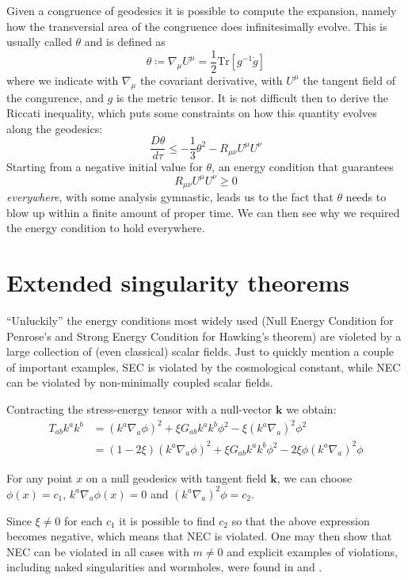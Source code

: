 \documentclass[12pt, a4paper]{article}
\begin{document}
Given a congruence of geodesics it is possible to compute the expansion, namely how the transversial area of the congruence does infinitesimally evolve. This is usually called \(\theta\) and is defined as 
\[
\theta \coloneqq \nabla_{\mu} U^{\mu} = \frac{1}{2} \text{Tr}\left[g^{-1}\dot{g}\right]
\]
where we indicate with \(\nabla_{\mu}\) the covariant derivative, with \(U^{\mu}\) the tangent field of the congurence, and \(g\) is the metric tensor.
It is not difficult then to derive the Riccati inequality, which puts some constraints on how this quantity evolves along the geodesics:
\[
\frac{D\theta }{d\tau} \le -\frac{1}{3} \theta ^2 - R_{\mu\nu}U^{\mu}U^{\nu}
\]
Starting from a negative initial value for \(\theta\), an energy condition that guarantees 
\[
R_{\mu\nu}U^{\mu}U^{\nu} \ge 0
\]
\emph{everywhere}, with some analysis gymnastic, leads us to the fact that \(\theta\) needs to blow up within a finite amount of proper time.
We can then see why we required the energy condition to hold everywhere.

\section{Extended singularity theorems}
``Unluckily'' the energy conditions most widely used (Null Energy Condition for Penrose's and Strong Energy Condition for Hawking's theorem) are violeted by a large collection of (even classical) scalar fields. 
Just to quickly mention a couple of important examples, SEC is violated by the cosmological constant, while NEC can be violated by non-minimally coupled scalar fields.

Contracting the stress-energy tensor with a null-vector \(\textbf{k}\) we obtain:
\begin{align*}
	T_{ab}k^ak^b &= (k^a\nabla_a\phi)^2 + \xi G_{ab}k^ak^b\phi^2 -\xi(k^a\nabla_a)^2\phi^2 \\
	&= (1 - 2\xi)(k^a\nabla_a\phi)^2 + \xi G_{ab}k^ak^b\phi^2 - 2\xi\phi(k^a\nabla_a)^2\phi
\end{align*}

For any point \(x\) on a null geodesics with tangent field \(\textbf{k}\), we can choose \(\phi(x) = c_1\), \(k^a\nabla_a \phi(x) = 0\) and \((k^a\nabla_a)^2\phi = c_2\).

Since \(\xi \neq 0 \) for each \(c_1\) it is possible to find \(c_2\) so that the above expression becomes negative, which means that NEC is violated.
One may then show that NEC can be violated in all cases with \(m \neq 0 \) and explicit examples of violations, including naked singularities and wormholes, were found in \cite{barcelo1999traversable} and \cite{barcelo2000scalar}.
\end{document}
